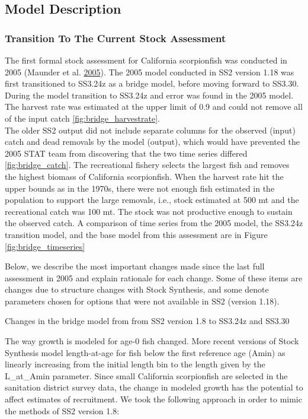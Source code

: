 \documentclass[12pt,]{article}
\begin{document}
\subsection{Model Description}\label{model-description}

\subsubsection{Transition To The Current Stock
Assessment}\label{transition-to-the-current-stock-assessment}

The first formal stock assessment for California scorpionfish was
conducted in 2005 (Maunder et al.
\protect\hyperlink{ref-Maunder2005}{2005}). The 2005 model conducted in
SS2 version 1.18 was first transitioned to SS3.24z as a bridge model,
before moving forward to SS3.30. During the model transition to SS3.24z
and error was found in the 2005 model. The harvest rate was estimated at
the upper limit of 0.9 and could not remove all of the input catch
\ref{fig:bridge_harvestrate}.\\
The older SS2 output did not include separate columns for the observed
(input) catch and dead removals by the model (output), which would have
prevented the 2005 STAT team from discovering that the two time series
differed \ref{fig:bridge_catch}. The recreational fishery selects the
largest fish and removes the highest biomass of California scorpionfish.
When the harvest rate hit the upper bounds as in the 1970s, there were
not enough fish estimated in the population to support the large
removals, i.e., stock estimated at 500 mt and the recreational catch was
100 mt. The stock was not productive enough to sustain the observed
catch. A comparison of time series from the 2005 model, the SS3.24z
transition model, and the base model from this assessment are in Figure
\ref{fig:bridge_timeseries}

Below, we describe the most important changes made since the last full
assessment in 2005 and explain rationale for each change. Some of these
items are changes due to structure changes with Stock Synthesis, and
some denote parameters chosen for options that were not available in SS2
(version 1.18).

Changes in the bridge model from from SS2 version 1.8 to SS3.24z and
SS3.30

The way growth is modeled for age-0 fish changed. More recent versions
of Stock Synthesis model length-at-age for fish below the first
reference age (Amin) as linearly increasing from the initial length bin
to the length given by the L\_at\_Amin parameter. Since small California
scorpionfish are selected in the sanitation district survey data, the
change in modeled growth has the potential to affect estimates of
recruitment. We took the following approach in order to mimic the
methods of SS2 version 1.8:
\end{document}
